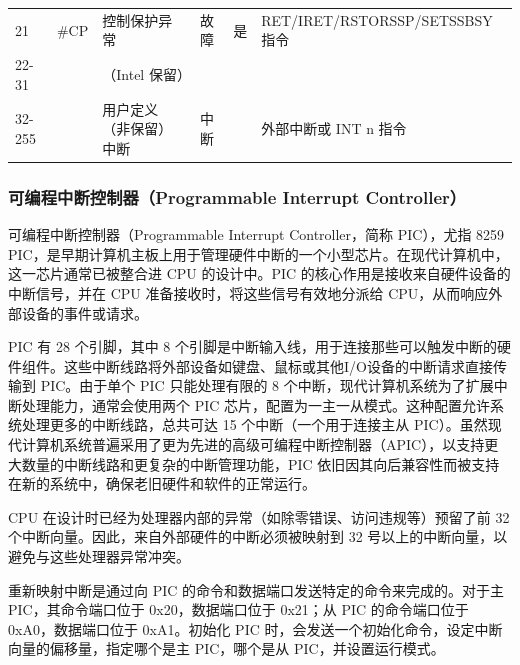 \begin{longtable}[c]{@{}llllll@{}}
    21          & \#CP         & 控制保护异常                                                                                                                                                 & 故障          & 是             & RET/IRET/RSTORSSP/SETSSBSY 指令 \\
    22-31       &              & （Intel 保留）                                                                                                                                             &             &               &                               \\
    32-255      &              & 用户定义（非保留）中断                                                                                                                                            & 中断          &               & 外部中断或 INT n 指令                \\ \bottomrule
\end{longtable}

\subsubsection{可编程中断控制器（Programmable Interrupt Controller）}

可编程中断控制器（Programmable Interrupt Controller，简称 PIC），尤指 8259 PIC，是早期计算机主板上用于管理硬件中断的一个小型芯片。在现代计算机中，这一芯片通常已被整合进 CPU 的设计中。PIC 的核心作用是接收来自硬件设备的中断信号，并在 CPU 准备接收时，将这些信号有效地分派给 CPU，从而响应外部设备的事件或请求。

PIC 有 28 个引脚，其中 8 个引脚是中断输入线，用于连接那些可以触发中断的硬件组件。这些中断线路将外部设备如键盘、鼠标或其他I/O设备的中断请求直接传输到 PIC。由于单个 PIC 只能处理有限的 8 个中断，现代计算机系统为了扩展中断处理能力，通常会使用两个 PIC 芯片，配置为一主一从模式。这种配置允许系统处理更多的中断线路，总共可达 15 个中断（一个用于连接主从 PIC）。虽然现代计算机系统普遍采用了更为先进的高级可编程中断控制器（APIC），以支持更大数量的中断线路和更复杂的中断管理功能，PIC 依旧因其向后兼容性而被支持在新的系统中，确保老旧硬件和软件的正常运行。

CPU 在设计时已经为处理器内部的异常（如除零错误、访问违规等）预留了前 32 个中断向量。因此，来自外部硬件的中断必须被映射到 32 号以上的中断向量，以避免与这些处理器异常冲突。

重新映射中断是通过向 PIC 的命令和数据端口发送特定的命令来完成的。对于主 PIC，其命令端口位于 0x20，数据端口位于 0x21；从 PIC 的命令端口位于 0xA0，数据端口位于 0xA1。初始化 PIC 时，会发送一个初始化命令，设定中断向量的偏移量，指定哪个是主 PIC，哪个是从 PIC，并设置运行模式。

